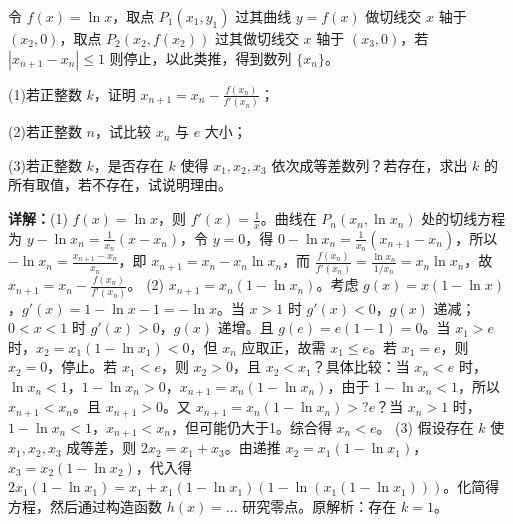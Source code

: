 \begin{question}[points=18]
令 $f(x)=\ln x$，取点 $P_1(x_1,y_1)$ 过其曲线 $y=f(x)$ 做切线交 $x$ 轴于 $(x_2,0)$，取点 $P_2(x_2,f(x_2))$ 过其做切线交 $x$ 轴于 $(x_3,0)$，若 $|x_{n+1}-x_n|\le 1$ 则停止，以此类推，得到数列 $\{x_n\}$。

(1)若正整数 $k$，证明 $x_{n+1}=x_n-\frac{f(x_n)}{f'(x_n)}$；

(2)若正整数 $n$，试比较 $x_n$ 与 $e$ 大小；

(3)若正整数 $k$，是否存在 $k$ 使得 $x_1,x_2,x_3$ 依次成等差数列？若存在，求出 $k$ 的所有取值，若不存在，试说明理由。
\begin{solution}

\textbf{详解：}(1) $f(x)=\ln x$，则 $f'(x)=\frac{1}{x}$。曲线在 $P_n(x_n,\ln x_n)$ 处的切线方程为 $y-\ln x_n=\frac{1}{x_n}(x-x_n)$，令 $y=0$，得 $0-\ln x_n=\frac{1}{x_n}(x_{n+1}-x_n)$，所以 $-\ln x_n = \frac{x_{n+1}-x_n}{x_n}$，即 $x_{n+1}=x_n-x_n\ln x_n$，而 $\frac{f(x_n)}{f'(x_n)}=\frac{\ln x_n}{1/x_n}=x_n\ln x_n$，故 $x_{n+1}=x_n-\frac{f(x_n)}{f'(x_n)}$。
(2) $x_{n+1}=x_n(1-\ln x_n)$。考虑 $g(x)=x(1-\ln x)$，$g'(x)=1-\ln x-1=-\ln x$。当 $x>1$ 时 $g'(x)<0$，$g(x)$ 递减；$0<x<1$ 时 $g'(x)>0$，$g(x)$ 递增。且 $g(e)=e(1-1)=0$。当 $x_1>e$ 时，$x_2=x_1(1-\ln x_1)<0$，但 $x_n$ 应取正，故需 $x_1\le e$。若 $x_1=e$，则 $x_2=0$，停止。若 $x_1<e$，则 $x_2>0$，且 $x_2<x_1$？具体比较：当 $x_n<e$ 时，$\ln x_n<1$，$1-\ln x_n>0$，$x_{n+1}=x_n(1-\ln x_n)$，由于 $1-\ln x_n<1$，所以 $x_{n+1}<x_n$。且 $x_{n+1}>0$。又 $x_{n+1}=x_n(1-\ln x_n) >? e$？当 $x_n>1$ 时，$1-\ln x_n<1$，$x_{n+1}<x_n$，但可能仍大于1。综合得 $x_n<e$。
(3) 假设存在 $k$ 使 $x_1,x_2,x_3$ 成等差，则 $2x_2=x_1+x_3$。由递推 $x_2=x_1(1-\ln x_1)$，$x_3=x_2(1-\ln x_2)$，代入得 $2x_1(1-\ln x_1)=x_1+x_1(1-\ln x_1)(1-\ln(x_1(1-\ln x_1)))$。化简得方程，然后通过构造函数 $h(x)=...$ 研究零点。原解析：存在 $k=1$。
\end{solution}
\end{question}

